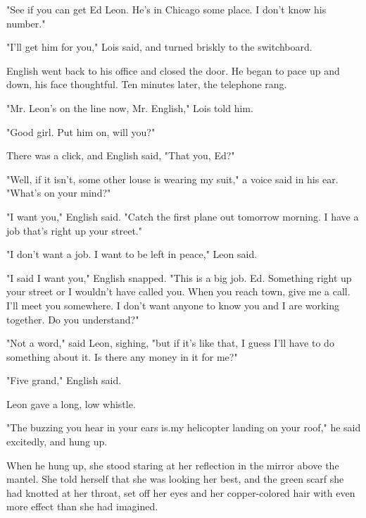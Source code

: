 \documentclass{novel}
\begin{document}
"See if you can get Ed Leon. He's in Chicago some place. I don't know his number."

"I'll get him for you," Lois said, and turned briskly to the switchboard.

English went back to his office and closed the door. He began to pace up and down, his face thoughtful. Ten minutes later, the telephone rang.

"Mr. Leon's on the line now, Mr. English," Lois told him.

"Good girl. Put him on, will you?"

There was a click, and English said, "That you, Ed?"

"Well, if it isn't, some other louse is wearing my suit," a voice said in his ear. "What's on your mind?"

"I want you," English said. "Catch the first plane out tomorrow morning. I have a job that's right up your street."

"I don't want a job. I want to be left in peace," Leon said.

"I said I want you," English snapped. "This is a big job. Ed. Something right up your street or I wouldn't have called you. When you reach town, give me a call. I'll meet you somewhere. I don't want anyone to know you and I are working together. Do you understand?"

"Not a word," said Leon, sighing, "but if it's like that, I guess I'll have to do something about it. Is there any money in it for me?"

"Five grand," English said.

Leon gave a long, low whistle.

"The buzzing you hear in your ears is.my helicopter landing on your roof," he said excitedly, and hung up.

\vspace{2\nbs}
\clearpage
\thispagestyle{empty}

\begin{ChapterStart}
\vspace{3\nbs}
\end{ChapterStart}
    
When he hung up, she stood staring at her reflection in the mirror above the mantel. She told herself that she was looking her best, and the green scarf she had knotted at her throat, set off her eyes and her copper-colored hair with even more effect than she had imagined.
\end{document}

